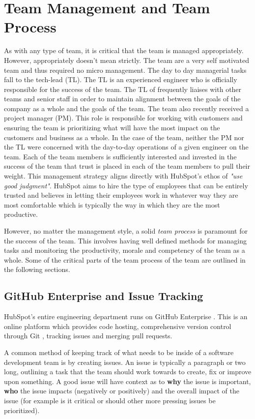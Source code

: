 \chapter{Team Management and Team Process}
As with any type of team, it is critical that the team is managed appropriately. However, appropriately doesn't mean strictly. The \team{} team are a very self motivated team and thus required no micro management. The day to day managerial tasks fall to the tech-lead (TL). The TL is an experienced engineer who is officially responsible for the success of the team. The TL of \team{} frequently liaises with other teams and senior staff in order to maintain alignment between the goals of the company as a whole and the goals of the team. The \team{} team also recently received a project manager (PM). This role is responsible for working with customers and ensuring the team is prioritizing what will have the most impact on the customers and business as a whole. In the case of the \team{} team, neither the PM nor the TL were concerned with the day-to-day operations of a given engineer on the team. Each of the team members is sufficiently interested and invested in the success of the team that trust is placed in each of the team members to pull their weight. This management strategy aligns directly with HubSpot's ethos of \textit{"use good judgment"}. HubSpot aims to hire the type of employees that can be entirely trusted and believes in letting their employees work in whatever way they are most comfortable which is typically the way in which they are the most productive.

However, no matter the management style, a solid \textit{team process} is paramount for the success of the team. This involves having well defined methods for managing tasks and monitoring the productivity, morale and competency of the team as a whole. Some of the critical parts of the team process of the \team{} team are outlined in the following sections.

\section{GitHub Enterprise and Issue Tracking}\label{sec:issueTracking}
HubSpot's entire engineering department runs on GitHub Enterprise \cite{githubEnterp}. This is an online platform which provides code hosting, comprehensive version control through Git \cite{git}, tracking issues and merging pull requests. 

A common method of keeping track of what needs to be inside of a software development team is by creating issues. An issue is typically a paragraph or two long, outlining a task that the team should work towards to create, fix or improve upon something. A good issue will have context as to \textbf{why} the issue is important, \textbf{who} the issue impacts (negatively or positively) and the overall impact of the issue (for example is it critical or should other more pressing issues be prioritized). 

